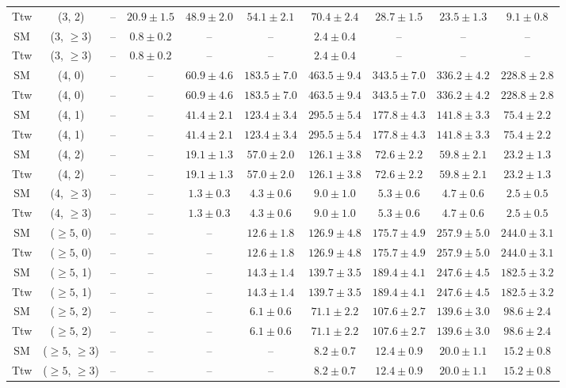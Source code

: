 \begin{table}[h!]
{\begin{tabular}{cccccccccc}
	Ttw & (3, 2) & -- & $20.9\pm 1.5$ & $48.9\pm 2.0$ & $54.1\pm 2.1$ & $70.4\pm 2.4$ & $28.7\pm 1.5$ & $23.5\pm 1.3$ & $9.1\pm 0.8$ \\[0.5ex] 
	SM & (3, $\ge3$) & -- & $0.8\pm 0.2$ & -- & -- & $2.4\pm 0.4$ & -- & -- & -- \\[0.5ex] 
	Ttw & (3, $\ge3$) & -- & $0.8\pm 0.2$ & -- & -- & $2.4\pm 0.4$ & -- & -- & -- \\[0.5ex] 
	SM & (4, 0) & -- & -- & $60.9\pm 4.6$ & $183.5\pm 7.0$ & $463.5\pm 9.4$ & $343.5\pm 7.0$ & $336.2\pm 4.2$ & $228.8\pm 2.8$ \\[0.5ex] 
	Ttw & (4, 0) & -- & -- & $60.9\pm 4.6$ & $183.5\pm 7.0$ & $463.5\pm 9.4$ & $343.5\pm 7.0$ & $336.2\pm 4.2$ & $228.8\pm 2.8$ \\[0.5ex] 
	SM & (4, 1) & -- & -- & $41.4\pm 2.1$ & $123.4\pm 3.4$ & $295.5\pm 5.4$ & $177.8\pm 4.3$ & $141.8\pm 3.3$ & $75.4\pm 2.2$ \\[0.5ex] 
	Ttw & (4, 1) & -- & -- & $41.4\pm 2.1$ & $123.4\pm 3.4$ & $295.5\pm 5.4$ & $177.8\pm 4.3$ & $141.8\pm 3.3$ & $75.4\pm 2.2$ \\[0.5ex] 
	SM & (4, 2) & -- & -- & $19.1\pm 1.3$ & $57.0\pm 2.0$ & $126.1\pm 3.8$ & $72.6\pm 2.2$ & $59.8\pm 2.1$ & $23.2\pm 1.3$ \\[0.5ex] 
	Ttw & (4, 2) & -- & -- & $19.1\pm 1.3$ & $57.0\pm 2.0$ & $126.1\pm 3.8$ & $72.6\pm 2.2$ & $59.8\pm 2.1$ & $23.2\pm 1.3$ \\[0.5ex] 
	SM & (4, $\ge3$) & -- & -- & $1.3\pm 0.3$ & $4.3\pm 0.6$ & $9.0\pm 1.0$ & $5.3\pm 0.6$ & $4.7\pm 0.6$ & $2.5\pm 0.5$ \\[0.5ex] 
	Ttw & (4, $\ge3$) & -- & -- & $1.3\pm 0.3$ & $4.3\pm 0.6$ & $9.0\pm 1.0$ & $5.3\pm 0.6$ & $4.7\pm 0.6$ & $2.5\pm 0.5$ \\[0.5ex] 
	SM & ($\ge5$, 0) & -- & -- & -- & $12.6\pm 1.8$ & $126.9\pm 4.8$ & $175.7\pm 4.9$ & $257.9\pm 5.0$ & $244.0\pm 3.1$ \\[0.5ex] 
	Ttw & ($\ge5$, 0) & -- & -- & -- & $12.6\pm 1.8$ & $126.9\pm 4.8$ & $175.7\pm 4.9$ & $257.9\pm 5.0$ & $244.0\pm 3.1$ \\[0.5ex] 
	SM & ($\ge5$, 1) & -- & -- & -- & $14.3\pm 1.4$ & $139.7\pm 3.5$ & $189.4\pm 4.1$ & $247.6\pm 4.5$ & $182.5\pm 3.2$ \\[0.5ex] 
	Ttw & ($\ge5$, 1) & -- & -- & -- & $14.3\pm 1.4$ & $139.7\pm 3.5$ & $189.4\pm 4.1$ & $247.6\pm 4.5$ & $182.5\pm 3.2$ \\[0.5ex] 
	SM & ($\ge5$, 2) & -- & -- & -- & $6.1\pm 0.6$ & $71.1\pm 2.2$ & $107.6\pm 2.7$ & $139.6\pm 3.0$ & $98.6\pm 2.4$ \\[0.5ex] 
	Ttw & ($\ge5$, 2) & -- & -- & -- & $6.1\pm 0.6$ & $71.1\pm 2.2$ & $107.6\pm 2.7$ & $139.6\pm 3.0$ & $98.6\pm 2.4$ \\[0.5ex] 
	SM & ($\ge5$, $\ge3$) & -- & -- & -- & -- & $8.2\pm 0.7$ & $12.4\pm 0.9$ & $20.0\pm 1.1$ & $15.2\pm 0.8$ \\[0.5ex] 
	Ttw & ($\ge5$, $\ge3$) & -- & -- & -- & -- & $8.2\pm 0.7$ & $12.4\pm 0.9$ & $20.0\pm 1.1$ & $15.2\pm 0.8$ \\[0.5ex] 
	\hline
	\hline
\end{tabular}}
\end{table}
